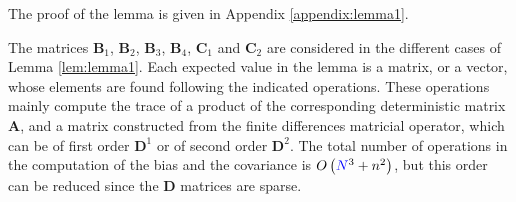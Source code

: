 \normalsize

The proof of the lemma is given in Appendix \ref{appendix:lemma1}.

The matrices $\mathbf{B}_1$, $\mathbf{B}_2$, $\mathbf{B}_3$, $\mathbf{B}_4$, $\mathbf{C}_1$ and $\mathbf{C}_2$ are considered in the different cases of Lemma \ref{lem:lemma1}.
Each expected value in the lemma is a matrix, or a vector, whose elements are found following the indicated operations.
These operations mainly compute the trace of a product of the corresponding deterministic matrix $\mathbf{A}$, and a matrix constructed from the finite differences matricial operator, which can be of first order $\mathbf{D}^{1}$ or of second order $\mathbf{D}^{2}$.
The total number of operations in the computation of the bias and the covariance is $O\left( \color{blue}N\color{black}^3 + n^2 \right)$, but this order can be reduced since the $\mathbf{D}$ matrices are sparse.


